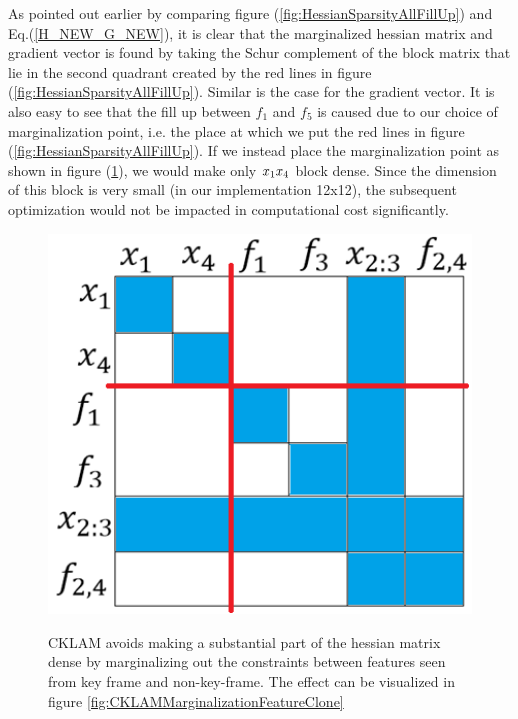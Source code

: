 As pointed out earlier by comparing figure (\ref{fig:HessianSparsityAllFillUp}) and Eq.(\ref{H_NEW_G_NEW}), it is clear that the marginalized hessian matrix and gradient vector is found by taking the Schur complement of the block matrix that lie in the second quadrant created by the red lines in figure (\ref{fig:HessianSparsityAllFillUp}). Similar is the case for the gradient vector. It is also easy to see that the fill up between $f_1$ and $f_5$ is caused due to our choice of marginalization point, i.e. the place at which we put the red lines in figure (\ref{fig:HessianSparsityAllFillUp}). If we instead place the marginalization point as shown in figure (\ref{fig:HessianSparsityAllFillUpKeepSparsity}), we would make only $x_1\-x_4$ block dense. Since the dimension of this block is very small (in our implementation 12x12), the subsequent optimization would not be impacted in computational cost significantly.

\begin{figure}[ht]
	\centering
		\includegraphics[width=1.00\textwidth]{images/HessianSparsityAllFillUpKeepSparsity.png}
	\label{fig:HessianSparsityAllFillUpKeepSparsity}
  \caption{CKLAM avoids making a substantial part of the hessian matrix dense by marginalizing out the constraints between features seen from key frame and non-key-frame. The effect can be visualized in figure \ref{fig:CKLAMMarginalizationFeatureClone}}
\end{figure}


